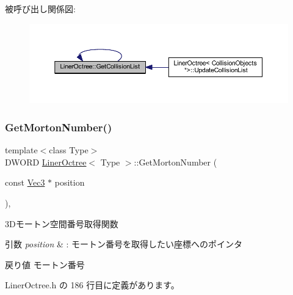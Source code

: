 被呼び出し関係図\+:\nopagebreak
\begin{figure}[H]
\begin{center}
\leavevmode
\includegraphics[width=350pt]{class_liner_octree_ac74ebba8b5f12fa94745a899b222e2b6_icgraph}
\end{center}
\end{figure}
\mbox{\label{class_liner_octree_ad931e5f3ae94cd4337dd96d133ee42a8}} 
\subsubsection{\texorpdfstring{Get\+Morton\+Number()}{GetMortonNumber()}}
{\footnotesize\ttfamily template$<$class Type$>$ \\
D\+W\+O\+RD \mbox{\hyperlink{class_liner_octree}{Liner\+Octree}}$<$ Type $>$\+::Get\+Morton\+Number (\begin{DoxyParamCaption}\item[{const \mbox{\hyperlink{_vector3_d_8h_ab16f59e4393f29a01ec8b9bbbabbe65d}{Vec3}} $\ast$}]{position }\end{DoxyParamCaption})\hspace{0.3cm}{\ttfamily [inline]}, {\ttfamily [private]}}



3\+Dモートン空間番号取得関数 


\begin{DoxyParams}{引数}
{\em position} & \+: モートン番号を取得したい座標へのポインタ \\
\hline
\end{DoxyParams}
\begin{DoxyReturn}{戻り値}
モートン番号 
\end{DoxyReturn}


 Liner\+Octree.\+h の 186 行目に定義があります。

